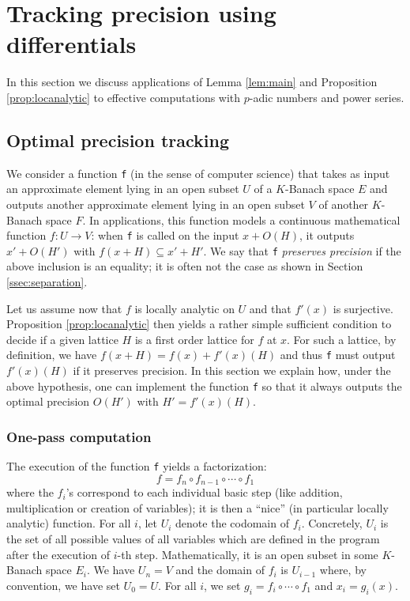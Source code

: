 \documentclass{lms}
\begin{document}

\section{Tracking precision using differentials}
\label{sec:tracking}

In this section we discuss applications of Lemma \ref{lem:main} and Proposition \ref{prop:locanalytic}
to effective computations with $p$-adic numbers and power series.

\subsection{Optimal precision tracking}

We consider a function {\tt f} (in the sense of computer 
science) that takes as input an approximate element lying in an open 
subset $U$ of a $K$-Banach space $E$ and outputs another approximate
element lying in an open subset $V$ of another $K$-Banach space $F$.
In applications, this function models a continuous
mathematical function $f : U \to V$: when 
{\tt f} is called on the input $x + O(H)$, it outputs $x' + O(H')$ with 
$f(x+H) \subseteq x' + H'$. We say that {\tt f} \emph{preserves precision}
if the above inclusion is an equality; it is 
often not the case as shown in Section \ref{ssec:separation}.

Let us assume now that $f$ is locally analytic on $U$ and
that $f'(x)$ is surjective. Proposition \ref{prop:locanalytic} then 
yields a rather simple sufficient condition to decide if a given lattice 
$H$ is a first order lattice for $f$ at $x$. For such a lattice, by 
definition, we have $f(x+H) = f(x) + f'(x)(H)$ and thus {\tt f}
must output $f'(x)(H)$ if it preserves precision. In this section we
explain how, under the above hypothesis, one can implement the function 
{\tt f} so that it always outputs the optimal precision $O(H')$ with $H' 
= f'(x)(H)$.

\subsubsection*{One-pass computation}

The execution of the function {\tt f} yields a factorization:
$$f = f_n \circ f_{n-1} \circ \cdots \circ f_1$$
where the $f_i$'s correspond to each individual basic step (like 
addition, multiplication or creation of variables); it is then a
``nice'' (in particular locally analytic) function. For all 
$i$, let $U_i$ denote the codomain of $f_i$. Concretely, $U_i$ is the 
set of all possible values of all variables which are defined in the 
program after the execution of $i$-th step. Mathematically, it is an 
open subset in some $K$-Banach space $E_i$. We have $U_n = V$ and the 
domain of $f_i$ is $U_{i-1}$ where, by convention, we have set $U_0 = 
U$.
For all $i$, we set $g_i = f_i \circ \cdots \circ f_1$ and $x_i = 
g_i(x)$. 
\end{document}
